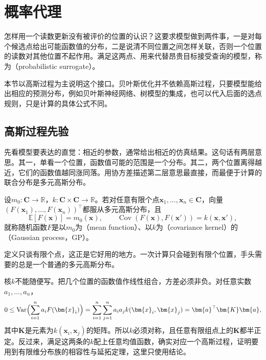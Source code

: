 \section{概率代理}
\label{sec:bo-surrogate}

怎样用一个读数更新没有被评价的位置的认识？这要求模型做到两件事，一是对每个候选点给出可能函数值的分布，二是说清不同位置之间怎样关联，否则一个位置的读数对其他位置不起作用。满足这两点、用来代替昂贵目标接受查询的模型，称为（probabilistic surrogate）。

本节以高斯过程为主说明这个接口。贝叶斯优化并不依赖高斯过程，只要模型能给出相应的预测分布，例如贝叶斯神经网络、树模型的集成，也可以代入后面的选点规则，只是计算的具体公式不同。

\subsection{高斯过程先验}
\label{sec:bo-gp-prior}

先看模型要表达的直觉：相近的参数，通常给出相近的仿真结果。这句话有两层意思。其一，单看一个位置，函数值可能的范围是一个分布。其二，两个位置离得越近，它们的函数值越同涨同落。用协方差描述第二层意思最直接，而最便于计算的联合分布是多元高斯分布。

\begin{definition}[高斯过程]
\label{def:bo-gp}
设$m_0:\bm{C}\to\mathbb{R}$，$k:\bm{C}\times\bm{C}\to\mathbb{R}$。若对任意有限个点$\bm{x}_1,\ldots,\bm{x}_n\in\bm{C}$，向量$(F(\bm{x}_1),\ldots,F(\bm{x}_n))^\top$都服从多元高斯分布，且
\begin{equation}
 \mathbb{E}[F(\bm{x})]=m_0(\bm{x}),\qquad
 \operatorname{Cov}(F(\bm{x}),F(\bm{x}'))=k(\bm{x},\bm{x}'),
 \label{eq:bo-gp}
\end{equation}
就称随机函数$F$是以$m_0$为（mean function）、以$k$为（covariance kernel）的（Gaussian process，GP）。
\end{definition}

定义只谈有限个点，这正是它好用的地方。一次计算只会碰到有限个位置，手头需要的总是一个普通的多元高斯分布。

核$k$不能随便写。把几个位置的函数值作线性组合，方差必须非负。对任意实数$a_1,\ldots,a_n$，
\[
 0\leq\operatorname{Var}\Bigl(\sum_{i=1}^n a_iF(\bm{x}_i)\Bigr)
 =\sum_{i=1}^n\sum_{j=1}^n a_ia_jk(\bm{x}_i,\bm{x}_j)
 =\bm{a}^\top\bm{K}\bm{a},
\]
其中$\bm{K}$是元素为$k(\bm{x}_i,\bm{x}_j)$的矩阵。所以$k$必须对称，且任意有限组点上的$\bm{K}$都半正定。反过来，满足这两条的$k$配上任意均值函数，确实对应一个高斯过程，证明要用到有限维分布族的相容性与延拓定理，这里只使用结论。

